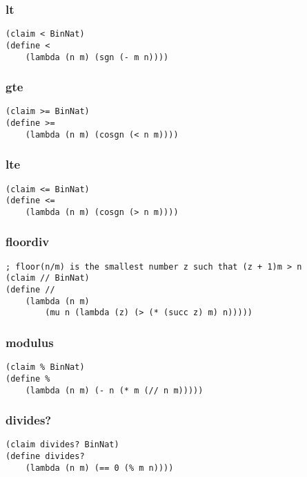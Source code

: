 \subsubsection{lt} \label{code:lt}
\begin{lstlisting}
(claim < BinNat)
(define <
    (lambda (n m) (sgn (- m n))))
\end{lstlisting}

\subsubsection{gte} \label{code:gte}
\begin{lstlisting}
(claim >= BinNat)
(define >=
    (lambda (n m) (cosgn (< n m))))
\end{lstlisting}

\subsubsection{lte} \label{code:lte}
\begin{lstlisting}
(claim <= BinNat)
(define <=
    (lambda (n m) (cosgn (> n m))))
\end{lstlisting}

\subsubsection{floordiv} \label{code:floordiv}
\begin{lstlisting}
; floor(n/m) is the smallest number z such that (z + 1)m > n
(claim // BinNat)
(define //
    (lambda (n m)
        (mu n (lambda (z) (> (* (succ z) m) n)))))
\end{lstlisting}

\subsubsection{modulus} \label{code:modulus}
\begin{lstlisting}
(claim % BinNat)
(define %
    (lambda (n m) (- n (* m (// n m)))))
\end{lstlisting}

\subsubsection{divides?} \label{code:divides?}
\begin{lstlisting}
(claim divides? BinNat)
(define divides?
    (lambda (n m) (== 0 (% m n))))
\end{lstlisting}

